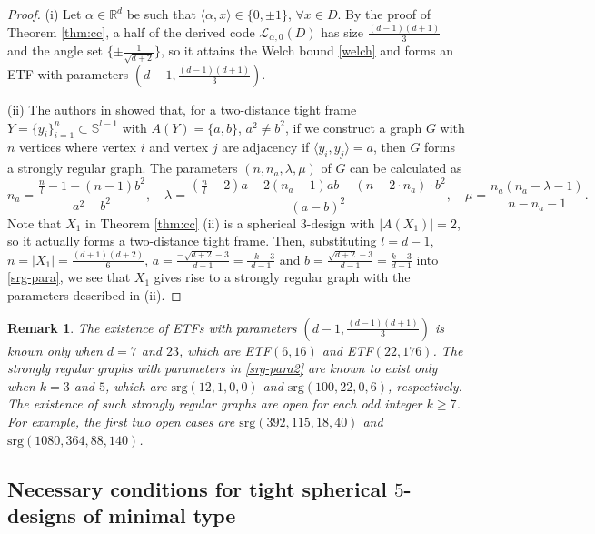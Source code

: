 \documentclass[11pt]{article}
\newtheorem{remark}{Remark}[section]
\theoremstyle{definition}
\theoremstyle{remark}
\begin{document}
\begin{proof}
(i)
Let $\alpha\in \mathbb{R}^d$ be such that $\langle \alpha,x\rangle\in\{0,\pm 1\}$, $\forall x\in D$.
By the proof of Theorem \ref{thm:cc}, a half of the derived code $\mathcal{L}_{\alpha,0}(D)$ has size $\frac{(d-1)(d+1)}{3}$ and the angle set $\{\pm\frac{1}{\sqrt{d+2}}\}$, so it attains the Welch bound \eqref{welch} and forms an ETF with parameters $(d-1,\frac{(d-1)(d+1)}{3})$. 

(ii) The authors in \cite[Proposition 3.2]{BGOY15} showed that, for  a two-distance tight frame $Y=\{y_i\}_{i=1}^n\subset\mathbb{S}^{l-1}$ with $A(Y)=\{a,b\}$, $a^2\neq b^2$, if we construct a graph $G$ with $n$ vertices where vertex $i$ and vertex $j$ are adjacency if $\langle y_i,y_j\rangle=a$, then $G$ forms a strongly regular graph. The parameters $(n,n_a,\lambda,\mu)$ of $G$ can be calculated as
\begin{equation}\label{srg-para}
n_a=\frac{\frac{n}{l}-1-(n-1)b^2}{a^2-b^2},\quad \lambda=\frac{(\frac{n}{l}-2)a-2(n_a-1)ab-(n-2\cdot n_a)\cdot b^2}{(a-b)^2},\quad \mu=\frac{n_a(n_a-\lambda-1)}{n-n_a-1}.
\end{equation}
Note that $X_1$ in Theorem \ref{thm:cc} (ii) is a spherical $3$-design with $|A(X_1)|=2$, so it actually forms a two-distance tight frame. 
Then, substituting $l=d-1$, $n=|X_1|=\frac{(d+1)(d+2)}{6}$, $a=\frac{-\sqrt{d+2}-3}{d-1}=\frac{-k-3}{d-1}$ and $b=\frac{\sqrt{d+2}-3}{d-1}=\frac{k-3}{d-1}$ into \eqref{srg-para}, we see that $X_1$ gives rise to a strongly regular graph with the parameters described in (ii).

\end{proof}

\begin{remark}
The existence of {\rm ETFs} with parameters $(d-1,\frac{(d-1)(d+1)}{3})$ is known only when $d=7$ and $23$, which are {\rm ETF}$(6,16)$ and {\rm ETF}$(22,176)$.
The strongly regular graphs with parameters in \eqref{srg-para2} are known to exist only when $k=3$ and $5$, which are $\mathrm{srg}(12,1,0,0)$ and $\mathrm{srg}(100,22,0,6)$, respectively. The existence of such strongly regular graphs are open for each odd integer $k\geq 7$. For example, the first two open cases are $\mathrm{srg}(392,115,18,40)$ and $\mathrm{srg}(1080,364,88,140)$.
\end{remark}

\subsection{Necessary conditions for tight spherical $5$-designs of minimal type }
\end{document}
